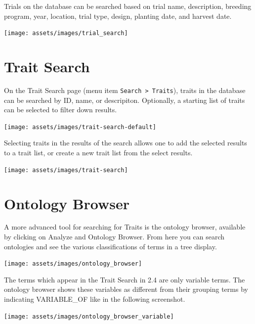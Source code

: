 \documentclass[
  12pt,
]{book}
\begin{document}
Trials on the database can be searched based on trial name, description, breeding program, year, location, trial type, design, planting date, and harvest date.

\begin{center}\texttt{[image: assets/images/trial\_search]} \end{center}

\hypertarget{trait-search}{%
\section{Trait Search}\label{trait-search}}

On the Trait Search page (menu item \texttt{Search\ \textgreater{}\ Traits}), traits in the database can be searched by ID, name, or descripiton. Optionally, a starting list of traits can be selected to filter down results.

\begin{center}\texttt{[image: assets/images/trait-search-default]} \end{center}

Selecting traits in the results of the search allows one to add the selected results to a trait list, or create a new trait list from the select results.

\begin{center}\texttt{[image: assets/images/trait-search]} \end{center}

\hypertarget{ontology-browser}{%
\section{Ontology Browser}\label{ontology-browser}}

A more advanced tool for searching for Traits is the ontology browser, available by clicking on Analyze and Ontology Browser. From here you can search ontologies and see the various classifications of terms in a tree display.

\begin{center}\texttt{[image: assets/images/ontology\_browser]} \end{center}

The terms which appear in the Trait Search in 2.4 are only variable terms. The ontology browser shows these variables as different from their grouping terms by indicating VARIABLE\_OF like in the following screenshot.

\begin{center}\texttt{[image: assets/images/ontology\_browser\_variable]} \end{center}
\end{document}
